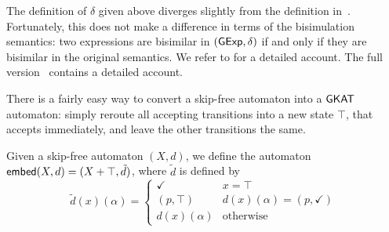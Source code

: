 \documentclass[orivec,envcountsect,envcountsame]{llncs}
\begin{document}

\begin{remark}
The definition of $\delta$ given above diverges slightly from the definition in~\cite{gkaticalp}.
Fortunately, this does not make a difference in terms of the bisimulation semantics: two expressions are bisimilar in $(\mathsf{GExp}, \delta)$ if and only if they are bisimilar in the original semantics.
\ifarxiv%
We refer to  for a detailed account.
\else%
The full version~\cite{fullversion} contains a detailed account.
\fi%
\end{remark}

There is a fairly easy way to convert a skip-free automaton into a $\textsf{GKAT}$ automaton: simply reroute all accepting transitions into a new state $\top$, that accepts immediately, and leave the other transitions the same.

\begin{definition}
Given a skip-free automaton $(X, d)$, we define the automaton $\mathsf{embed}(X, d) = (X + \top, \tilde{d})$, where $\tilde{d}$ is defined by
\[
    \tilde{d}(x)(\alpha) =
        \begin{cases}
        \checkmark & x = \top \\
        (p, \top) & d(x)(\alpha) = (p, \checkmark) \\
        d(x)(\alpha) & \text{otherwise}
        \end{cases}
\]
\end{definition}
\end{document}
